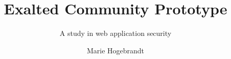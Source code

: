 \documentclass[a4paper,project,final]{miunthes} %
\title{Exalted Community Prototype}
\subtitle{A study in web application security}
\author{Marie Hogebrandt}
\begin{document}
	\begin{titlingpage}
		\maketitle
	\end{titlingpage}
	\frontmatter
	
	\cleardoublepage
	
	\cleardoublepage
	\tableofcontents
	\cleardoublepage
	\listoffigures
	\cleardoublepage
	\listoftables
	\cleardoublepage
	\printnomenclature

	\mainmatter
	
	
	
	
	
	
	

  \printbibliography

	\appendix
	

	\backmatter
\end{document}
